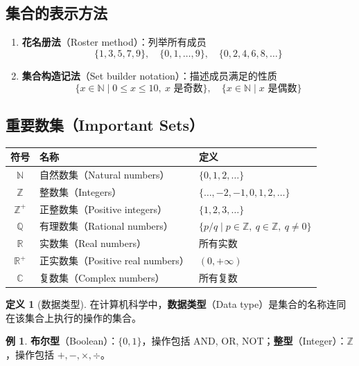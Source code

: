 \documentclass[UTF8,11pt,a4paper]{ctexbook}   %
\theoremstyle{definition}
\newtheorem{definition}{定义}[section]
\newtheorem{example}{例}[section]
\begin{document}
\subsection{集合的表示方法}

\begin{enumerate}[leftmargin=2em]
    \item \textbf{花名册法}（Roster method）：列举所有成员
    \[
    \{1, 3, 5, 7, 9\}, \quad \{0, 1, \ldots, 9\}, \quad \{0, 2, 4, 6, 8, \ldots\}
    \]
    
    \item \textbf{集合构造记法}（Set builder notation）：描述成员满足的性质
    \[
    \{x \in \mathbb{N} \mid 0 \leq x \leq 10,\ x \text{ 是奇数}\}, \quad \{x \in \mathbb{N} \mid x \text{ 是偶数}\}
    \]
\end{enumerate}

\subsection{重要数集（Important Sets）}

\begin{table}[htbp]
\centering
\begin{tabular}{|c|l|l|}
\hline
\textbf{符号} & \textbf{名称} & \textbf{定义} \\
\hline
$\mathbb{N}$ & 自然数集（Natural numbers） & $\{0, 1, 2, \ldots\}$ \\
$\mathbb{Z}$ & 整数集（Integers） & $\{\ldots, -2, -1, 0, 1, 2, \ldots\}$ \\
$\mathbb{Z}^+$ & 正整数集（Positive integers） & $\{1, 2, 3, \ldots\}$ \\
$\mathbb{Q}$ & 有理数集（Rational numbers） & $\{p/q \mid p \in \mathbb{Z},\ q \in \mathbb{Z},\ q \neq 0\}$ \\
$\mathbb{R}$ & 实数集（Real numbers） & 所有实数 \\
$\mathbb{R}^+$ & 正实数集（Positive real numbers） & $(0, +\infty)$ \\
$\mathbb{C}$ & 复数集（Complex numbers） & 所有复数 \\
\hline
\end{tabular}
\end{table}

\begin{definition}[数据类型]
在计算机科学中，\textbf{数据类型}（Data type）是集合的名称连同在该集合上执行的操作的集合。
\end{definition}

\begin{example}
\textbf{布尔型}（Boolean）：$\{0, 1\}$，操作包括 AND, OR, NOT；\textbf{整型}（Integer）：$\mathbb{Z}$，操作包括 $+, -, \times, \div$。
\end{example}
\end{document}
